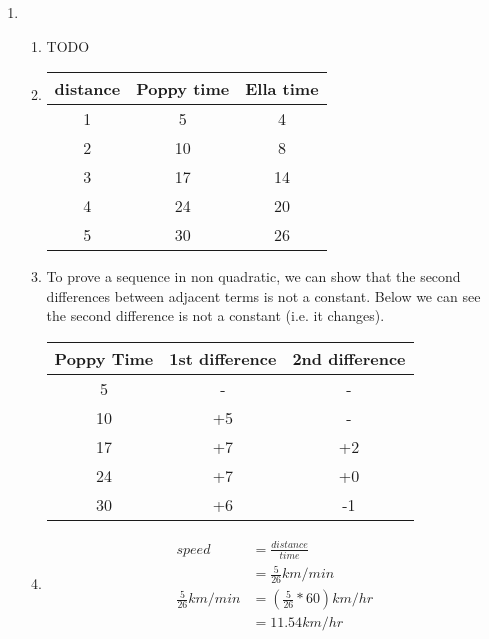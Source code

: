 \documentclass[11pt]{article}
\begin{document}
\begin{enumerate}
        
    \pagebreak
    \item
        \begin{enumerate}
            \item
                TODO
            \item
                \begin{center}
                    \begin{tabular}{ |c|c|c| } 
                        \hline
                        distance & Poppy time & Ella time \\ 
                        \hline
                        1 & 5 & 4 \\ 
                        2 & 10 & 8 \\ 
                        3 & 17 & 14 \\
                        4 & 24 & 20 \\
                        5 & 30 & 26 \\
                        \hline
                    \end{tabular}
               \end{center}
            \item
                To prove a sequence in non quadratic, we can show that the second differences between adjacent terms is not a constant. Below we can see the second difference is not a constant (i.e. it changes).
                \begin{center}
                    \begin{tabular}{ |c|c|c| } 
                        \hline
                        Poppy Time & 1st difference & 2nd difference \\ 
                        \hline
                        5 & - & - \\ 
                        10 & +5 & - \\ 
                        17 & +7 & +2 \\
                        24 & +7 & +0 \\
                        30 & +6 & -1 \\
                        \hline
                    \end{tabular}
               \end{center}
            \item
                \begin{equation*}
                    \begin{split}
                        speed&=\frac{distance}{time}\\
                        &=\frac{5}{26}km/min\\
                        \frac{5}{26}km/min&=(\frac{5}{26}*60)km/hr\\
                        &=11.54km/hr
                    \end{split}
                \end{equation*}


\end{enumerate}
\end{enumerate}
\end{document}
